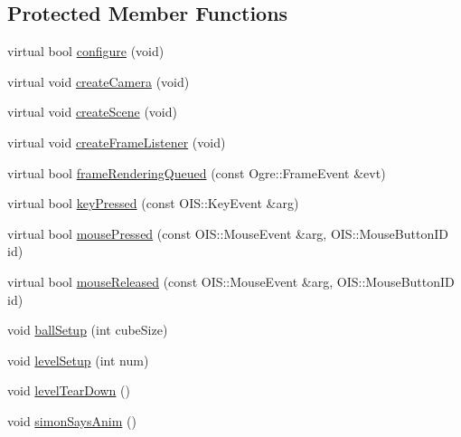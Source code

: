 \subsection*{Protected Member Functions}
\begin{DoxyCompactItemize}
\item 
virtual bool \hyperlink{classTileGame_a460265525565530c2d5d448a4f10cce1}{configure} (void)
\item 
virtual void \hyperlink{classTileGame_af68126fe7750735a9d3850f11cf93354}{create\-Camera} (void)
\item 
virtual void \hyperlink{classTileGame_a7a58cee3d3b0f06d80da0b06bae68347}{create\-Scene} (void)
\item 
virtual void \hyperlink{classTileGame_a8e62f0508c93131c11ed08e0adbedfbb}{create\-Frame\-Listener} (void)
\item 
virtual bool \hyperlink{classTileGame_abfa3b829a661de02f3f4bf2d8102bd49}{frame\-Rendering\-Queued} (const Ogre\-::\-Frame\-Event \&evt)
\item 
virtual bool \hyperlink{classTileGame_af96355c8ea5a968b5ceb5090ea4e811e}{key\-Pressed} (const O\-I\-S\-::\-Key\-Event \&arg)
\item 
virtual bool \hyperlink{classTileGame_a1826b5a7db94eb11037a46c5d57dfc4f}{mouse\-Pressed} (const O\-I\-S\-::\-Mouse\-Event \&arg, O\-I\-S\-::\-Mouse\-Button\-I\-D id)
\item 
virtual bool \hyperlink{classTileGame_ab7a0cbe5c9d1f41fa3b16486437511e4}{mouse\-Released} (const O\-I\-S\-::\-Mouse\-Event \&arg, O\-I\-S\-::\-Mouse\-Button\-I\-D id)
\item 
void \hyperlink{classTileGame_a512ac0031cfe85e79ca0a53582492240}{ball\-Setup} (int cube\-Size)
\item 
void \hyperlink{classTileGame_a1da6c5e8d396ebdfe05c2eedf28a2ca8}{level\-Setup} (int num)
\item 
void \hyperlink{classTileGame_a55045a99dda1545c4043ab6da75d2432}{level\-Tear\-Down} ()
\item 
void \hyperlink{classTileGame_aabd8c2eb7913022c30119846d57eaba5}{simon\-Says\-Anim} ()
\end{DoxyCompactItemize}
